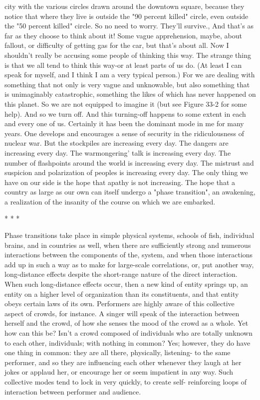 city with the various circles drawn around the downtown square, because they notice
that where they live is outside the "90 percent killed" circle, even outside the "50
percent killed" circle. So no need to worry. They'll survive., And that's as far as they
choose to think about it! Some vague apprehension, maybe, about fallout, or difficulty
of getting gas for the car, but that's about all.
        Now I shouldn't really be accusing some people of thinking this way. The
strange thing is that we all tend to think this way-or at least parts of us do. (At least I
can speak for myself, and I think I am a very typical person.) For we are dealing with
something that not only is very vague and unknowable, but also something that is
unimaginably catastrophic, something the likes of which has never happened on this
planet. So we are not equipped to imagine it (but see Figure 33-2 for some help). And
so we turn off. And this turning-off happens to some extent in each and every one of
us. Certainly it has been the dominant mode in me for many years. One develops and
encourages a sense of security in the ridiculousness of nuclear war.
        But the stockpiles are increasing every day. The dangers are increasing every
day. The warmongering' talk is increasing every day. The number of flashpoints
around the world is increasing every day. The mistrust and suspicion and polarization
of peoples is increasing every day. The only thing we have on our side is the hope that
apathy is not increasing. The hope that a country as large as our own can itself
undergo a "phase transition", an awakening, a realization of the insanity of the course
on which we are embarked.

                                        *       *       *

        Phase transitions take place in simple physical systems, schools of fish,
individual brains, and in countries as well, when there are sufficiently strong and
numerous interactions between the components of the, system, and when those
interactions add up in such a way as to make for large-scale correlations, or, put
another way, long-distance effects despite the short-range nature of the direct
interaction. When such long-distance effects occur, then a new kind of entity springs
up, an entity on a higher level of organization than its constituents, and that entity
obeys certain laws of its own.
        Performers are highly aware of this collective aspect of crowds, for instance. A
singer will speak of the interaction between herself and the crowd, of how she senses
the mood of the crowd as a whole. Yet how can this be? Isn't a crowd composed of
individuals who are totally unknown to each other, individuals; with nothing in
common? Yes; however, they do have one thing in common: they are all there,
physically, listening- to the same performer, and so they are influencing each other
whenever they laugh at her jokes or applaud her, or encourage her or seem impatient
in any way. Such collective modes tend to lock in very quickly, to create self-
reinforcing loops of interaction between performer and audience.





